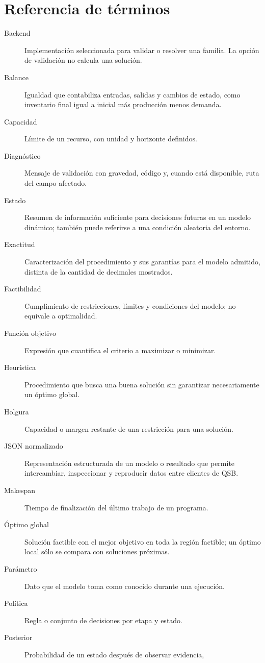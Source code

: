 \chapter{Referencia de términos}
\label{chap:terminos}
\begin{description}
 \item[Backend] Implementación seleccionada para validar o resolver una familia.
 La opción de validación no calcula una solución.
 \item[Balance] Igualdad que contabiliza entradas, salidas y cambios de estado,
 como inventario final igual a inicial más producción menos demanda.
 \item[Capacidad] Límite de un recurso, con unidad y horizonte definidos.
 \item[Diagnóstico] Mensaje de validación con gravedad, código y, cuando está
 disponible, ruta del campo afectado.
 \item[Estado] Resumen de información suficiente para decisiones futuras en un
 modelo dinámico; también puede referirse a una condición aleatoria del entorno.
 \item[Exactitud] Caracterización del procedimiento y sus garantías para el
 modelo admitido, distinta de la cantidad de decimales mostrados.
 \item[Factibilidad] Cumplimiento de restricciones, límites y condiciones del
 modelo; no equivale a optimalidad.
 \item[Función objetivo] Expresión que cuantifica el criterio a maximizar o minimizar.
 \item[Heurística] Procedimiento que busca una buena solución sin garantizar
 necesariamente un óptimo global.
 \item[Holgura] Capacidad o margen restante de una restricción para una solución.
 \item[JSON normalizado] Representación estructurada de un modelo o resultado
 que permite intercambiar, inspeccionar y reproducir datos entre clientes de QSB.
 \item[Makespan] Tiempo de finalización del último trabajo de un programa.
 \item[Óptimo global] Solución factible con el mejor objetivo en toda la región
 factible; un óptimo local sólo se compara con soluciones próximas.
 \item[Parámetro] Dato que el modelo toma como conocido durante una ejecución.
 \item[Política] Regla o conjunto de decisiones por etapa y estado.
 \item[Posterior] Probabilidad de un estado después de observar evidencia,

\end{description}
